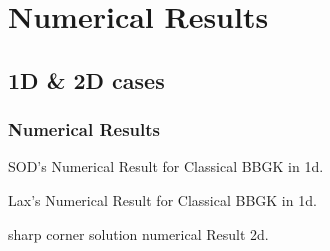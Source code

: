 \section{Numerical Results}
\subsection{1D \& 2D cases}

\begin{frame} \frametitle{Numerical Results}
	SOD's Numerical Result for Classical BBGK in 1d.
\end{frame}

\begin{frame}
	Lax's Numerical Result for Classical BBGK in 1d.
\end{frame}

\begin{frame}
	sharp corner solution numerical Result 2d.
\end{frame}